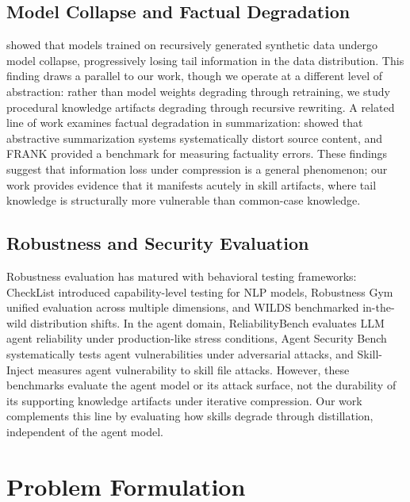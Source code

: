 \documentclass[11pt]{article}
\begin{document}
\subsection{Model Collapse and Factual Degradation}

\citet{shumailov2024modelcollapse} showed that models trained on recursively generated synthetic data undergo model collapse, progressively losing tail information in the data distribution. This finding draws a parallel to our work, though we operate at a different level of abstraction: rather than model weights degrading through retraining, we study procedural knowledge artifacts degrading through recursive rewriting. A related line of work examines factual degradation in summarization: \citet{maynez2020faithfulness} showed that abstractive summarization systems systematically distort source content, and FRANK \citep{pagnoni2021frank} provided a benchmark for measuring factuality errors. These findings suggest that information loss under compression is a general phenomenon; our work provides evidence that it manifests acutely in skill artifacts, where tail knowledge is structurally more vulnerable than common-case knowledge.

\subsection{Robustness and Security Evaluation}

Robustness evaluation has matured with behavioral testing frameworks: CheckList \citep{ribeiro2020checklist} introduced capability-level testing for NLP models, Robustness Gym \citep{goel2021robustnessgym} unified evaluation across multiple dimensions, and WILDS \citep{koh2021wilds} benchmarked in-the-wild distribution shifts. In the agent domain, ReliabilityBench \citep{gupta2026reliabilitybench} evaluates LLM agent reliability under production-like stress conditions, Agent Security Bench \citep{zhang2025agentsecuritybench} systematically tests agent vulnerabilities under adversarial attacks, and Skill-Inject \citep{schmotz2026skillinject} measures agent vulnerability to skill file attacks. However, these benchmarks evaluate the agent model or its attack surface, not the durability of its supporting knowledge artifacts under iterative compression. Our work complements this line by evaluating how skills degrade through distillation, independent of the agent model.

\section{Problem Formulation}
\end{document}
